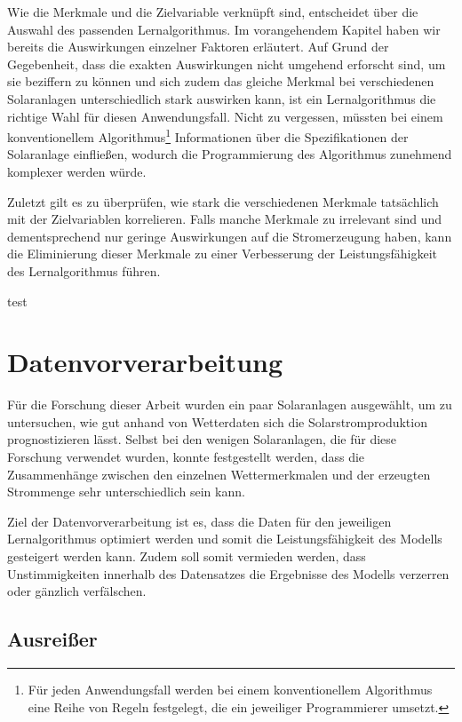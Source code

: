 \documentclass[12pt, a4paper]{article}
\begin{document}
Wie die Merkmale und die Zielvariable verknüpft sind, entscheidet über die Auswahl des passenden Lernalgorithmus. Im vorangehendem Kapitel haben wir bereits die Auswirkungen einzelner Faktoren erläutert. Auf Grund der Gegebenheit, dass die exakten Auswirkungen nicht umgehend erforscht sind, um sie beziffern zu können und sich zudem das gleiche Merkmal bei verschiedenen Solaranlagen unterschiedlich stark auswirken kann, ist ein Lernalgorithmus die richtige Wahl für diesen Anwendungsfall. Nicht zu vergessen, müssten bei einem konventionellem Algorithmus\footnote{Für jeden Anwendungsfall werden bei einem konventionellem Algorithmus eine Reihe von Regeln festgelegt, die ein jeweiliger Programmierer umsetzt.} Informationen über die Spezifikationen der Solaranlage einfließen, wodurch die Programmierung des Algorithmus zunehmend komplexer werden würde.

Zuletzt gilt es zu überprüfen, wie stark die verschiedenen Merkmale tatsächlich mit der Zielvariablen korrelieren. Falls manche Merkmale zu irrelevant sind und dementsprechend nur geringe Auswirkungen auf die Stromerzeugung haben, kann die Eliminierung dieser Merkmale zu einer Verbesserung der Leistungsfähigkeit des Lernalgorithmus führen. 

test

\newpage

\section{Datenvorverarbeitung}

Für die Forschung dieser Arbeit wurden ein paar Solaranlagen ausgewählt, um zu untersuchen, wie gut anhand von Wetterdaten sich die Solarstromproduktion prognostizieren lässt. Selbst bei den wenigen Solaranlagen, die für diese Forschung verwendet wurden, konnte festgestellt werden, dass die Zusammenhänge zwischen den einzelnen Wettermerkmalen und der erzeugten Strommenge sehr unterschiedlich sein kann.

Ziel der Datenvorverarbeitung ist es, dass die Daten für den jeweiligen Lernalgorithmus optimiert werden und somit die Leistungsfähigkeit des Modells gesteigert werden kann. Zudem soll somit vermieden werden, dass Unstimmigkeiten innerhalb des Datensatzes die Ergebnisse des Modells verzerren oder gänzlich verfälschen.

\subsection{Ausreißer}
\end{document}
